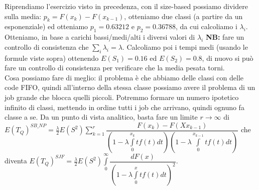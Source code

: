 \documentclass{article}
\begin{document}
Riprendiamo l'esercizio visto in precedenza, con il size-based possiamo dividere sulla media: $p_k = F(x_k) - F(x_{k-1})$, otteniamo due classi (a partire da un esponenziale) ed otteniamo $p_1 = 0.63212$ e $p_2 = 0.36788$, da cui calcoliamo i $\lambda_i$. Otteniamo, in base a carichi bassi/medi/alti i diversi valori di $\lambda_i$ \textbf{NB: }fare un controllo di consistenza che $\sum\limits_{i} \lambda_i = \lambda$. Calcoliamo poi i tempi medi (usando le formule viste sopra) ottenendo $E(S_1) = 0.16$ ed $E(S_2) = 0.8$, di nuovo si può fare un controllo di consistenza per verificare che la media pesata torni.\\ Cosa possiamo fare di meglio: il problema è che abbiamo delle classi con delle code FIFO, quindi all'interno della stessa classe possiamo avere il problema di un job grande che blocca quelli piccoli. Potremmo formare un numero ipotetico infinito di classi, mettendo in ordine tutti i job che arrivano, quindi ognuno fa classe a se. Da un punto di vista analitico, basta fare un limite $r \rightarrow \infty$  di $E(T_Q)^{SB\_NP} = \frac{\lambda}{2}E(S^2) \sum\limits_{k=1}^{r} \dfrac{F(x_k) - F(Xx_{k-1})}{(1 - \lambda \int\limits_{0}^{x_k} t f(t) dt)(1 - \lambda \int\limits_{0}^{x_{k-1}} t f(t) dt)}$ che diventa $E(T_Q)^{SJF} = \frac{\lambda}{2}E(S^2) \int\limits_{0}^{\infty} \dfrac{dF(x)}{(1 - \lambda \int\limits_{0}^{x} t f(t) dt)^2}$.
\end{document}
